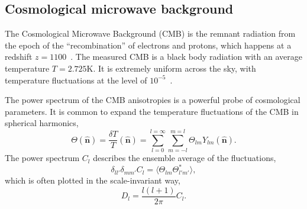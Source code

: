 \documentclass[doublespace,nopageskip]{VTthesis} %
\begin{document}
\subsection{Cosmological microwave background}

The Cosmological Microwave Background (CMB) is the remnant radiation from the epoch of the ``recombination'' of electrons and protons, which happens at a redshift $z = 1100$~\cite{2003moco.book.....D}. The measured CMB is a black body radiation with an average temperature $T = 2.725$K. It is extremely uniform across the sky, with temperature fluctuations at the level of $10^{-5}$~\cite{2002ARA&A..40..171H}. 

The power spectrum of the CMB anisotropies is a powerful probe of cosmological parameters. It is common to expand the temperature fluctuations of the CMB in spherical harmonics,
\begin{equation}
    \Theta(\hat{\bm n}) = \frac{\delta T}{T}(\hat{\bm n}) = \sum^{l=\infty}_{l=0}\sum^{m=l}_{m=-l} \Theta_{lm}Y_{lm}(\hat{\bm n}).
\end{equation}
The power spectrum $C_l$ describes the ensemble average of the fluctuations,
\begin{equation}
    \delta_{ll'}\delta_{mm'}C_l = \langle\Theta_{lm}\Theta^*_{l'm'}\rangle,
\end{equation}
which is often plotted in the scale-invariant way,
\begin{equation}
    D_l = \frac{l(l+1)}{2\pi}C_l.
\end{equation}
\end{document}
